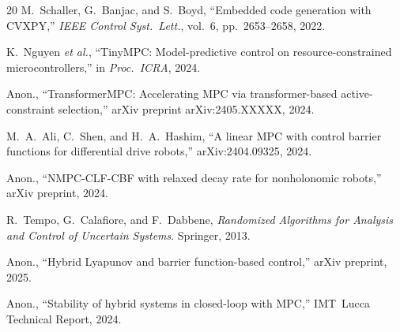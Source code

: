 \documentclass[journal]{IEEEtran}
\begin{document}
\begin{thebibliography}{20}
  M.~Schaller, G.~Banjac, and S.~Boyd,
  ``Embedded code generation with CVXPY,''
  \textit{IEEE Control Syst.\ Lett.}, vol.~6, pp.~2653--2658, 2022.

  K.~Nguyen \textit{et al.},
  ``TinyMPC: Model-predictive control on resource-constrained
  microcontrollers,''
  in \textit{Proc.\ ICRA}, 2024.

  Anon.,
  ``TransformerMPC: Accelerating MPC via transformer-based active-constraint
  selection,''
  arXiv preprint arXiv:2405.XXXXX, 2024.

  M.~A.~Ali, C.~Shen, and H.~A.~Hashim,
  ``A linear MPC with control barrier functions for differential drive
  robots,''
  arXiv:2404.09325, 2024.

  Anon.,
  ``NMPC-CLF-CBF with relaxed decay rate for nonholonomic robots,''
  arXiv preprint, 2024.

  R.~Tempo, G.~Calafiore, and F.~Dabbene,
  \textit{Randomized Algorithms for Analysis and Control of Uncertain
  Systems}. Springer, 2013.

  Anon.,
  ``Hybrid Lyapunov and barrier function-based control,''
  arXiv preprint, 2025.

  Anon.,
  ``Stability of hybrid systems in closed-loop with MPC,''
  IMT~Lucca Technical Report, 2024.
\end{thebibliography}
\end{document}
